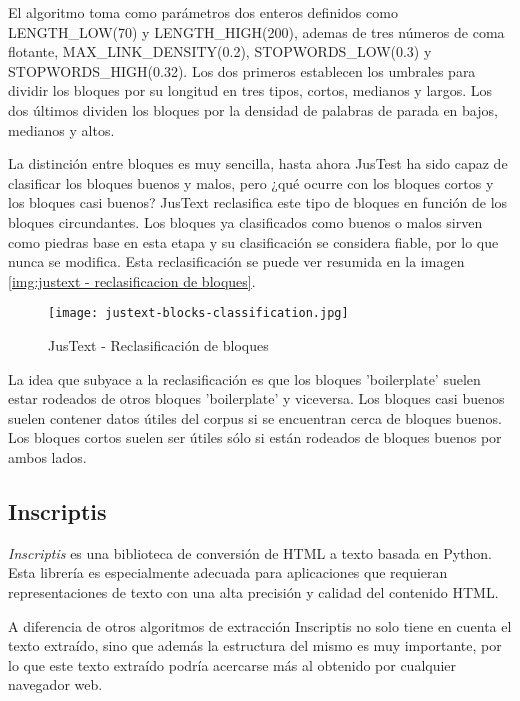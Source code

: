 El algoritmo toma como parámetros dos enteros definidos como LENGTH\_LOW(70) y LENGTH\_HIGH(200), ademas 
de tres números de coma flotante, MAX\_LINK\_DENSITY(0.2), STOPWORDS\_LOW(0.3) y STOPWORDS\_HIGH(0.32). 
Los dos primeros establecen los umbrales para dividir los bloques por su longitud en tres tipos, cortos, 
medianos y largos. Los dos últimos dividen los bloques por la densidad de palabras de parada en bajos, 
medianos y altos.

La distinción entre bloques es muy sencilla, hasta ahora JusTest ha sido capaz de clasificar los bloques
buenos y malos, pero ¿qué ocurre con los bloques cortos y los bloques casi buenos? JusText reclasifica
este tipo de bloques en función de los bloques circundantes. Los bloques ya clasificados como buenos o
malos sirven como piedras base en esta etapa y su clasificación se considera fiable, por lo que nunca se
modifica. Esta reclasificación se puede ver resumida en la imagen \ref{img:justext - reclasificacion de
bloques}.

\begin{figure}[tphb]
  \centering
  \texttt{[image: justext-blocks-classification.jpg]}
  \caption{JusText - Reclasificación de bloques}
  \label{img:justext - reclasificacion de bloques}
\end{figure}

La idea que subyace a la reclasificación es que los bloques 'boilerplate' suelen estar rodeados de otros 
bloques 'boilerplate' y viceversa. Los bloques casi buenos suelen contener datos útiles del corpus si se 
encuentran cerca de bloques buenos. Los bloques cortos suelen ser útiles sólo si están rodeados de bloques 
buenos por ambos lados.

\subsection{Inscriptis}
\label{subsec:inscriptis}

\emph{Inscriptis} \cite{inscriptis} es una biblioteca de conversión de HTML a texto basada en Python. Esta
librería es especialmente adecuada para aplicaciones que requieran representaciones de texto con una alta
precisión y calidad del contenido HTML.

A diferencia de otros algoritmos de extracción Inscriptis no solo tiene en cuenta el texto extraído, sino
que además la estructura del mismo es muy importante, por lo que este texto extraído podría acercarse más 
al obtenido por cualquier navegador web. 

